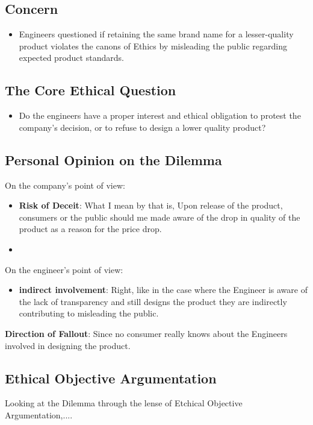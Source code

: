 \documentclass[11pt, a4paper]{article}
\begin{document}
\subsection{Concern}
\begin{itemize}
  \item Engineers questioned if retaining the same brand name for a lesser-quality product violates
        the canons of Ethics by misleading the public regarding expected product standards.
\end{itemize}
\subsection{The Core Ethical Question}
\begin{itemize}
  \item Do the engineers have a proper interest and ethical obligation to protest the company's
        decision, or to refuse to design a lower quality product?
\end{itemize}
\subsection{Personal Opinion on the Dilemma}
On the company's point of view:
\begin{itemize}
  \item \textbf{Risk of Deceit}: What I mean by that is, Upon release of the product, consumers or the
        public should me made aware of the drop in quality of the product as a reason for the price
        drop.
  \item
\end{itemize}
On the engineer's point of view:
\begin{itemize}
  \item \textbf{indirect involvement}: Right, like in the case where the Engineer is aware of the lack
        of transparency and still designs the product they are indirectly contributing to misleading
        the public.
\end{itemize}

\textbf{Direction of Fallout}: Since no consumer really knows about the Engineers involved in
designing the product.

\subsection{Ethical Objective Argumentation}
Looking at the Dilemma through the lense of  Etchical Objective Argumentation,....
\end{document}
